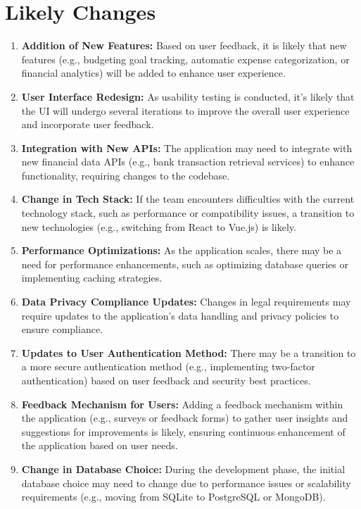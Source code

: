 \documentclass[12pt]{article}
\begin{document}
\newpage 

\section{Likely Changes}    

\begin{enumerate}[label=LC\arabic*]
	\item\textbf{Addition of New Features:} Based on user feedback, it is likely
	that new features (e.g., budgeting goal tracking, automatic expense
	categorization, or financial analytics) will be added to enhance user
	experience.
	\item\textbf{User Interface Redesign:} As usability testing is conducted, it's
	likely that the UI will undergo several iterations to improve the overall user
	experience and incorporate user feedback.
	\item \textbf{Integration with New APIs:} The application may need to
	integrate with new financial data APIs (e.g., bank transaction retrieval
	services) to enhance functionality, requiring changes to the codebase.
	\item \textbf{Change in Tech Stack:} If the team encounters difficulties with
	the current technology stack, such as performance or compatibility issues, a
	transition to new technologies (e.g., switching from React to Vue.js) is
	likely.
	\item \textbf{Performance Optimizations:} As the application scales, there may
	be a need for performance enhancements, such as optimizing database queries or
	implementing caching strategies.
	\item\textbf{Data Privacy Compliance Updates:} Changes in legal requirements
	may require updates to the application's data handling and privacy policies to
	ensure compliance.
	\item\textbf{Updates to User Authentication Method:} There may be a transition
	to a more secure authentication method (e.g., implementing two-factor
	authentication) based on user feedback and security best practices.
	\item\textbf{Feedback Mechanism for Users:} Adding a feedback mechanism within
	the application (e.g., surveys or feedback forms) to gather user insights and
	suggestions for improvements is likely, ensuring continuous enhancement of the
	application based on user needs.
  \item \textbf{Change in Database Choice:} During the development phase, the
	initial database choice may need to change due to performance issues or
	scalability requirements (e.g., moving from SQLite to PostgreSQL or MongoDB).
\end{enumerate}
\end{document}
